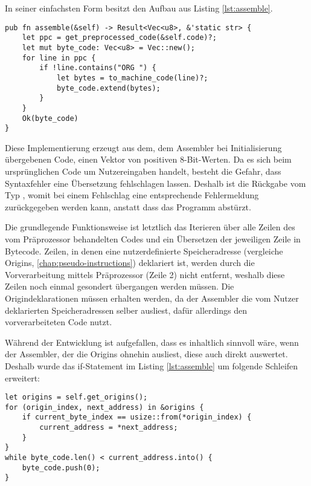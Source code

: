 In seiner einfachsten Form besitzt  den Aufbau aus Listing \ref{lst:assemble}.

\begin{listing}[ht]
\begin{verbatim}
pub fn assemble(&self) -> Result<Vec<u8>, &'static str> {
	let ppc = get_preprocessed_code(&self.code)?;
	let mut byte_code: Vec<u8> = Vec::new();
    for line in ppc {
        if !line.contains("ORG ") {
	        let bytes = to_machine_code(line)?;
            byte_code.extend(bytes);
        }
    }
    Ok(byte_code)
}
\end{verbatim}
\label{lst:assemble}
\end{listing}

Diese Implementierung erzeugt aus dem, dem Assembler bei Initialisierung übergebenen Code, einen Vektor von positiven 8-Bit-Werten. Da es sich beim ursprünglichen Code um Nutzereingaben handelt, besteht die Gefahr, dass Syntaxfehler eine Übersetzung fehlschlagen lassen. Deshalb ist die Rückgabe vom Typ , womit bei einem Fehlschlag eine entsprechende Fehlermeldung zurückgegeben werden kann, anstatt dass das Programm abstürzt.

Die grundlegende Funktionsweise ist letztlich das Iterieren über alle Zeilen des vom Präprozessor behandelten Codes und ein Übersetzen der jeweiligen Zeile in Bytecode. Zeilen, in denen eine nutzerdefinierte Speicheradresse (vergleiche Origins, \ref{chap:pseudo-instructions}) deklariert ist, werden durch die Vorverarbeitung mittels Präprozessor (Zeile 2) nicht entfernt, weshalb diese Zeilen noch einmal gesondert übergangen werden müssen. Die Origindeklarationen müssen erhalten werden, da der Assembler die vom Nutzer deklarierten Speicheradressen selber ausliest, dafür allerdings den vorverarbeiteten Code nutzt.

Während der Entwicklung ist aufgefallen, dass es inhaltlich sinnvoll wäre, wenn der Assembler, der die Origins ohnehin ausliest, diese auch direkt auswertet. Deshalb wurde das if-Statement im Listing \ref{lst:assemble} um folgende Schleifen erweitert:

\begin{listing}[ht]
\begin{verbatim}
let origins = self.get_origins();
for (origin_index, next_address) in &origins {
	if current_byte_index == usize::from(*origin_index) {
        current_address = *next_address;
    }
}
while byte_code.len() < current_address.into() {
    byte_code.push(0);
}
\end{verbatim}
\end{listing}


